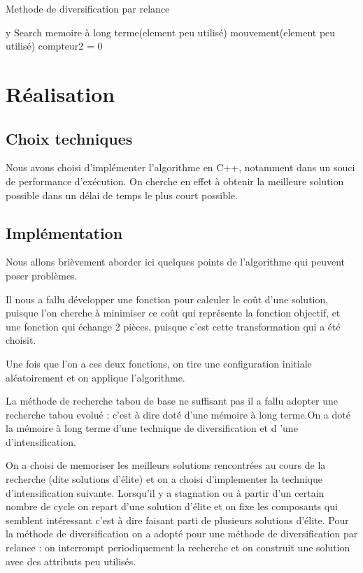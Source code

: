 \documentclass{report}
\begin{document}
\begin{algorithm}
\caption{Methode de diversification par relance}
\begin{algorithmic}
\REQUIRE y
\ENSURE 
{}
\STATE Search memoire à long terme(element peu utilisé)
\STATE mouvement(element peu utilisé)
\STATE compteur2 = 0
\ENDIF
\end{algorithmic}
\end{algorithm}

\section{Réalisation}
\subsection{Choix techniques}
Nous avons choisi d'implémenter l'algorithme en C++, notamment dans un souci de performance d’exécution. On cherche en effet à obtenir la meilleure solution possible dans un délai de temps le plus court possible. 

\subsection{Implémentation}
 Nous allons brièvement aborder ici quelques points de l’algorithme qui peuvent poser problèmes.

Il nous a fallu développer une fonction pour calculer le coût d'une solution, puisque l'on cherche à minimiser ce coût qui représente la fonction objectif, et une fonction qui échange 2 pièces, puisque c'est cette transformation qui a été choisit.

Une fois que l'on a ces deux fonctions, on tire une configuration initiale aléatoirement et on applique l'algorithme.

La méthode de recherche tabou de base ne suffisant pas il a fallu adopter une recherche tabou evolué : c'est à dire doté d'une mémoire à long terme.On a doté la mémoire à long terme d'une technique de diversification et d 'une d'intensification.

On a choisi de memoriser les meilleurs solutions rencontrées au cours de la recherche (dite solutions d'élite) et on a choisi d'implementer la technique d'intensification suivante.
Lorsqu'il y a stagnation ou à partir d'un certain nombre de cycle on repart d'une solution d'élite
et on fixe les composants qui semblent intéressant c'est à dire faisant parti de plusieurs solutions d'élite.
Pour la méthode de diversification on a adopté pour une méthode  de diversification par relance :
on interrompt periodiquement la recherche et on construit une solution avec des attributs peu utilisés. 
\end{document}
